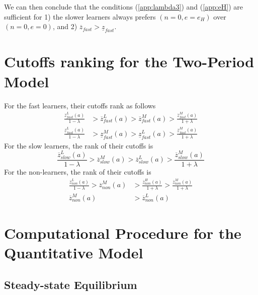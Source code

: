 \documentclass[12pt]{article}
\begin{document}
We can then conclude that the conditions (\ref{app:lambda3}) and (\ref{app:eH}) are sufficient for 1) the slower learners always prefers $(n=0,e=e_H)$ over $(n=0,e=0)$, and 2) $\overline{z}_{fast}>\underline{z}_{fast}$.

\section{Cutoffs ranking for the Two-Period Model}
For the fast learners, their cutoffs rank as follows 
\begin{align}
    \frac{\overline{z}^L_{fast}(a)}{1-\lambda}&>\overline{z}^L_{fast}(a)>\overline{z}^M_{fast}(a)>\frac{\overline{z}^M_{fast}(a)}{1+\lambda}  \\
    \frac{\underline{z}^L_{fast}(a)}{1-\lambda}&>\underline{z}^M_{fast}(a)>\underline{z}^L_{fast}(a)>\frac{\underline{z}^M_{fast}(a)}{1+\lambda}
\end{align}
For the slow learners, the rank of their cutoffs is
\begin{equation}
    \frac{\overline{z}^L_{slow}(a)}{1-\lambda}>\overline{z}^M_{slow}(a)>\overline{z}^L_{slow}(a)>\frac{\overline{z}^M_{slow}(a)}{1+\lambda}
\end{equation}
For the non-learners, the rank of their cutoffs is
\begin{align}
\frac{\overline{z}^L_{non}(a)}{1-\lambda} > \overline{z}^M_{non}(a) & > \frac{\overline{z}^H_{non}(a)}{1+\lambda} > \frac{\overline{z}^M_{non}(a)}{1+\lambda}\\
\overline{z}^M_{non}(a) & > \overline{z}^L_{non}(a)
\end{align}




\section{Computational Procedure for the Quantitative Model}

\subsection{Steady-state Equilibrium}
\end{document}
